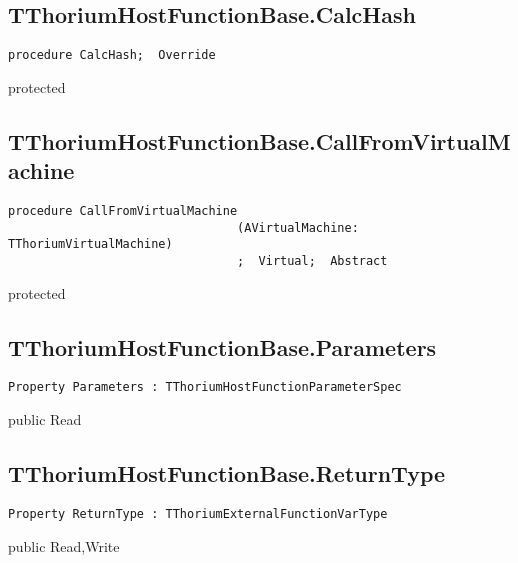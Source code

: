 \subsection{TThoriumHostFunctionBase.CalcHash}
\label{thoriumcore:thorium:tthoriumhostfunctionbase:calchash}
\begin{FPCList}
\Synopsis
\Declaration 

\begin{verbatim}
procedure CalcHash;  Override
\end{verbatim}
\Visibility
protected
\Description
\Errors
\end{FPCList}
\subsection{TThoriumHostFunctionBase.CallFromVirtualMachine}
\label{thoriumcore:thorium:tthoriumhostfunctionbase:callfromvirtualmachine}
\begin{FPCList}
\Synopsis
\Declaration 

\begin{verbatim}
procedure CallFromVirtualMachine
                                (AVirtualMachine: TThoriumVirtualMachine)
                                ;  Virtual;  Abstract
\end{verbatim}
\Visibility
protected
\Description
\Errors
\end{FPCList}
\subsection{TThoriumHostFunctionBase.Parameters}
\label{thoriumcore:thorium:tthoriumhostfunctionbase:parameters}
\begin{FPCList}
\Synopsis
\Declaration 

\begin{verbatim}
Property Parameters : TThoriumHostFunctionParameterSpec
\end{verbatim}
\Visibility
public
\Access
Read
\Description
\end{FPCList}
\subsection{TThoriumHostFunctionBase.ReturnType}
\label{thoriumcore:thorium:tthoriumhostfunctionbase:returntype}
\begin{FPCList}
\Synopsis
\Declaration 

\begin{verbatim}
Property ReturnType : TThoriumExternalFunctionVarType
\end{verbatim}
\Visibility
public
\Access
Read,Write
\Description
\end{FPCList}
